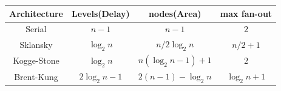 \begin{table}[H]
\centering
     \begin{tabular}{  c c c c  } 

        \hline
        Architecture & Levels(Delay) & nodes(Area) & max fan-out\\
        \hline
        
        Serial &
        $n-1$ &
        $n-1$ &
        $2$\\
        
        Sklansky &
        $\log_2 n$ &
        $n/2\log_2n$ &
        $n/2+1$\\
        
        Kogge-Stone &
        $\log_2n$ &
        $n(\log_2n-1)+1$ &
        $2$\\
        
        Brent-Kung &
        $2\log_2n-1$ &
        $ 2(n-1) - \log_2n $ &
        $\log_2n+1$\\
        
        \hline
        

        





\end{tabular}
\end{table}
